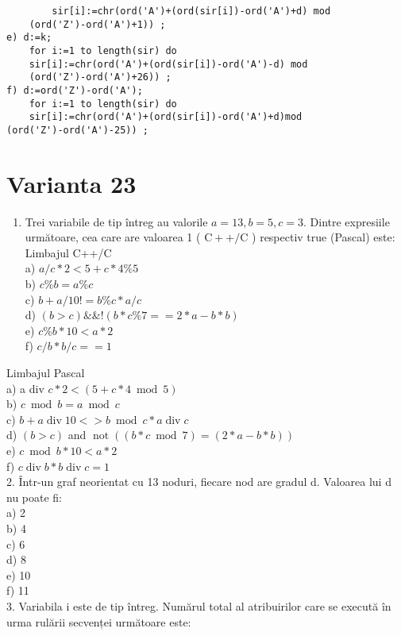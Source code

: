 \begin{verbatim}
        sir[i]:=chr(ord('A')+(ord(sir[i])-ord('A')+d) mod
    (ord('Z')-ord('A')+1)) ;
e) d:=k;
    for i:=1 to length(sir) do
    sir[i]:=chr(ord('A')+(ord(sir[i])-ord('A')-d) mod
    (ord('Z')-ord('A')+26)) ;
f) d:=ord('Z')-ord('A');
    for i:=1 to length(sir) do
    sir[i]:=chr(ord('A')+(ord(sir[i])-ord('A')+d)mod
(ord('Z')-ord('A')-25)) ;
\end{verbatim}

\section*{Varianta 23}
\begin{enumerate}
  \item Trei variabile de tip întreg au valorile $a=13, b=5, c=3$. Dintre expresiile următoare, cea care are valoarea 1 ( $\mathrm{C}++/ \mathrm{C}$ ) respectiv true (Pascal) este:\\
Limbajul C++/C\\
a) $a / c * 2<5+c * 4 \% 5$\\
b) $c \% b=a \% c$\\
c) $b+a / 10!=b \% c * a / c$\\
d) $(b>c) \& \&!(b * c \% 7==2 * a-b * b)$\\
e) $c \% b * 10<a * 2$\\
f) $c / b * b / c==1$
\end{enumerate}

Limbajul Pascal\\
a) a div $c * 2<(5+c * 4 \bmod 5)$\\
b) $c \bmod b=a \bmod c$\\
c) $b+a \operatorname{div} 10<>b \bmod c * a \operatorname{div} c$\\
d) $(b>c)$ and $\operatorname{not}((b * c \bmod 7)=(2 * a-b * b))$\\
e) $c \bmod b * 10<a * 2$\\
f) $c \operatorname{div} b * b \operatorname{div} c=1$\\
2. Într-un graf neorientat cu 13 noduri, fiecare nod are gradul d. Valoarea lui d nu poate fi:\\
a) 2\\
b) 4\\
c) 6\\
d) 8\\
e) 10\\
f) 11\\
3. Variabila i este de tip întreg. Numărul total al atribuirilor care se execută în urma rulării secvenței următoare este:

